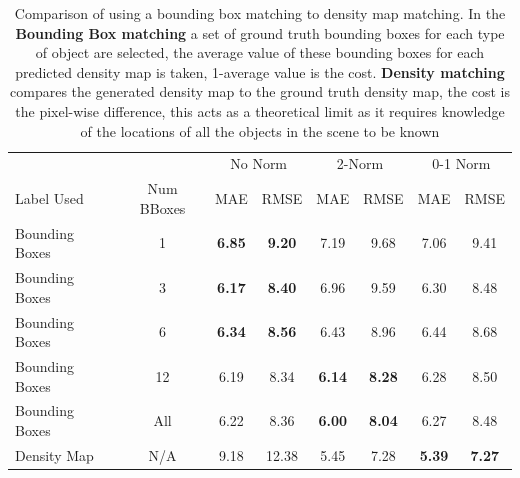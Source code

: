 \documentclass[../confirmation.tex]{subfiles}
\begin{document}
\begin{table}
	\centering
 \begin{tabular}{lccccccc}
 \toprule

 
 & & \multicolumn{2}{c}{No Norm} & \multicolumn{2}{c}{2-Norm} & \multicolumn{2}{c}{0-1 Norm} \\ 
 Label Used & Num BBoxes & MAE & RMSE & MAE & RMSE & MAE & RMSE \\ 
 \midrule
 Bounding Boxes & 1 & \textbf{6.85} & \textbf{9.20} & 7.19 & 9.68 & 7.06 & 9.41\\
 Bounding Boxes & 3 & \textbf{6.17} & \textbf{8.40} & 6.96 & 9.59 & 6.30 & 8.48\\
 Bounding Boxes & 6 & \textbf{6.34} & \textbf{8.56} & 6.43 & 8.96 & 6.44 & 8.68 \\
 Bounding Boxes & 12 & 6.19 & 8.34 & \textbf{6.14} & \textbf{8.28} & 6.28 & 8.50\\
 Bounding Boxes & All & 6.22 & 8.36 & \textbf{6.00} & \textbf{8.04} & 6.27 & 8.48\\
 \midrule
 Density Map & N/A & 9.18 & 12.38 
 & 5.45 & 7.28 & \textbf{5.39} & \textbf{7.27}\\
 \bottomrule
 \end{tabular}
	\caption{Comparison of using a bounding box matching to density map matching. In the \textbf{Bounding Box matching} a set of ground truth bounding boxes for each type of object are selected, the average value of these bounding boxes for each predicted density map is taken, 1-average value is the cost. 
 \textbf{Density matching} compares the generated density map to the ground truth density map, the cost is the pixel-wise difference, this acts as a theoretical limit as it requires knowledge of the locations of all the objects in the scene to be known}
	\label{tab:bbox_matching}
\end{table}


 








 

 
 
 
 
 
 
 
\end{document}
